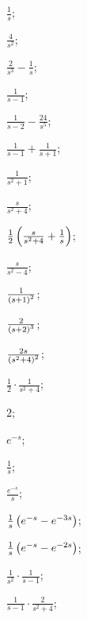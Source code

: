 	\begin{enumsols}

		\item \( \frac{1}{s} \); \sfill %
		\item \( \frac{4}{s^2} \); \sfill %
		\item \( \frac{2}{s^3} - \frac{1}{s} \); \sfill %
		\item \( \frac{1}{s - 1} \); \sfill %
		\item \( \frac{1}{s - 2} - \frac{24}{s^5} \); \sfill %
		\item \( \frac{1}{s - 1} + \frac{1}{s + 1} \); \sfill %
		\item \( \frac{1}{s^2 + 1} \); \sfill %
		\item \( \frac{s}{s^2 + 4} \); \sfill %
		\item \( \frac{1}{2} \left( \frac{s}{s^2 + 4} + \frac{1}{s} \right) \); \sfill %
		\item \( \frac{s}{s^2 - 4} \); \sfill %
		\item \( \frac{1}{\left( s + 1 \right)^2} \); \sfill %
		\item \( \frac{2}{\left( s + 2 \right)^3} \); \sfill %
		\item \( \frac{2s}{\left( s^2 + 4 \right)^2} \); \sfill %
		\item \( \frac{1}{2} \cdot \frac{1}{s^2 + 4} \); \sfill %

		\item \( 2 \); \sfill %
		\item \( e^{-s} \); \sfill %
		\item \( \frac{1}{s} \); \sfill %
		\item \( \frac{e^{-s}}{s} \); \sfill %
		\item \( \frac{1}{s} \left( e^{-s} - e^{-3s} \right) \); \sfill %
		\item \( \frac{1}{s} \left( e^{-s} - e^{-2s} \right) \); \sfill %
		\item \( \frac{1}{s^2} \cdot \frac{1}{s - 1} \); \sfill %
		\item \( \frac{1}{s-1} \cdot \frac{2}{s^2 + 4} \); \sfill %


\end{enumsols}
